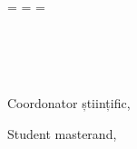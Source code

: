\begin{titlepage}
  \oddsidemargin=\evensidemargin\relax
  \textwidth=\dimexpr{}\evensidemargin-2in\relax
  \hsize=\textwidth\relax

  \centering


  \vspace{5mm}
  {\LARGE{\getUniversity{}}}\\
  
  \vspace{5mm}
  {\LARGE{\getFaculty{}}}\\
  
  \vspace{5mm}
  {\LARGE{\getDepartment{}}}\\

  \vfill
  {\huge\bfseries \getDoctype}

  \vfill
  \begin{flushleft}
  {\large Coordonator științific,}\\
  {\large \getAdvisor{}}
  \end{flushleft}

  \vspace{5mm}
  \begin{flushright}
  {\large Student masterand,}\\
  {\large \getAuthor{}}
  \end{flushright}


  \vfill
  {\huge{\getSubmissionLocation{}}}\\
  
  \vspace{5mm}
  {\huge\MakeUppercase{\getSubmissionDate}{}}\\

\end{titlepage}

